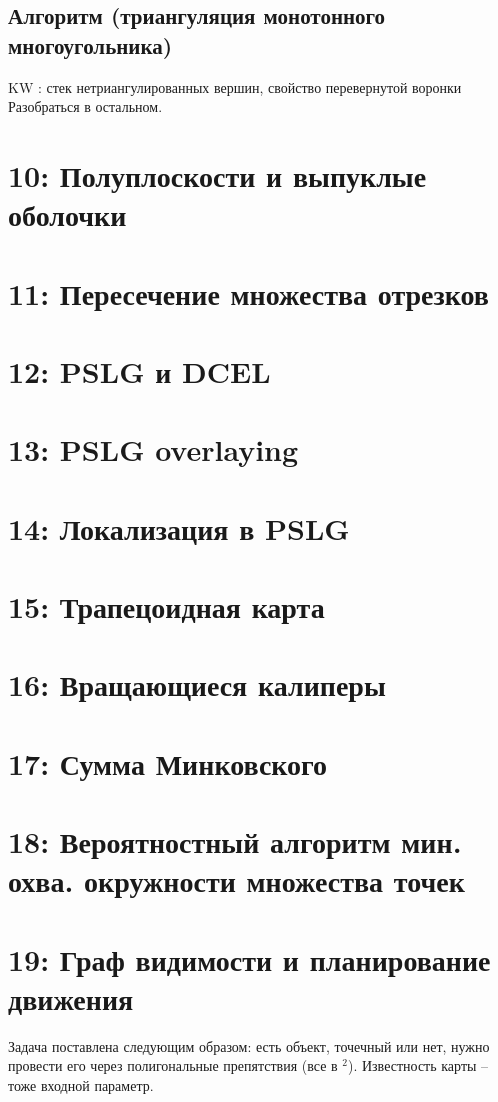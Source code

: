 \documentclass[11pt]{article}
\begin{document}
\subsection{Алгоритм (триангуляция монотонного многоугольника)}
\label{sec:orgheadline38}
KW : стек нетриангулированных вершин, свойство перевернутой воронки
Разобраться в остальном.
\section{{\bfseries{}} 10: Полуплоскости и выпуклые оболочки}
\label{sec:orgheadline40}
\section{{\bfseries{}} 11: Пересечение множества отрезков}
\label{sec:orgheadline41}
\section{{\bfseries{}} 12: PSLG и DCEL}
\label{sec:orgheadline42}
\section{{\bfseries{}} 13: PSLG overlaying}
\label{sec:orgheadline43}
\section{{\bfseries{}} 14: Локализация в PSLG}
\label{sec:orgheadline44}
\section{{\bfseries{}} 15: Трапецоидная карта}
\label{sec:orgheadline45}
\section{{\bfseries{}} 16: Вращающиеся калиперы}
\label{sec:orgheadline46}
\section{{\bfseries{}} 17: Сумма Минковского}
\label{sec:orgheadline47}
\section{{\bfseries{}} 18: Вероятностный алгоритм мин. охва. окружности множества точек}
\label{sec:orgheadline48}
\section{{\bfseries{}} 19: Граф видимости и планирование движения}
\label{sec:orgheadline49}
Задача поставлена следующим образом: есть объект, точечный или нет,
нужно провести его через полигональные препятствия (все в
\R\(^{\text{2}}\)). Известность карты -- тоже входной параметр.
\end{document}
